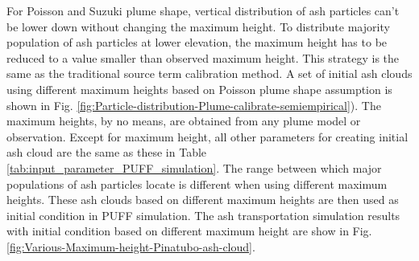 For Poisson and Suzuki plume shape, vertical distribution of ash particles can't be lower down without changing the maximum height. To distribute majority population of ash particles at lower elevation, the maximum height has to be reduced to a value smaller than observed maximum height. This strategy is the same as the traditional source term calibration method. A set of initial ash clouds using different maximum heights based on Poisson plume shape assumption is shown in Fig. \ref{fig:Particle-distribution-Plume-calibrate-semiempirical}). The maximum heights, by no means, are obtained from any plume model or observation. Except for maximum height, all other parameters for creating initial ash cloud are the same as these in Table \ref{tab:input_parameter_PUFF_simulation}. The range between which major populations of ash particles locate is different when using different maximum heights. These ash clouds based on different maximum heights are then used as initial condition in PUFF simulation. The ash transportation simulation results with initial condition based on different maximum height are show in Fig. \ref{fig:Various-Maximum-height-Pinatubo-ash-cloud}.

